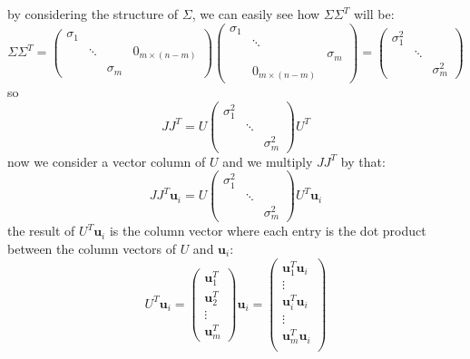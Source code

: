 \documentclass[10pt, a4paper]{report}
\begin{document}
by considering the structure of $\Sigma$, we can easily see how $\Sigma\Sigma^T$ will be:\begin{equation}
    \Sigma\Sigma^T=\begin{pmatrix}
        \sigma_1 & & & \\ 
        & \ddots & & 0_{m\times (n-m)}\\ 
        & & \sigma_m & 
    \end{pmatrix}
    \begin{pmatrix}
        \sigma_1 & &  \\ 
        & \ddots & \\ 
        & & \sigma_m \\
        &0_{m\times (n-m)}&
    \end{pmatrix}=\begin{pmatrix}
        \sigma_1^2 & &  \\ 
        & \ddots &   \\ 
        & & \sigma_m^2 
    \end{pmatrix}
\end{equation}
so\begin{equation}
JJ^T=U\begin{pmatrix}
        \sigma_1^2 & &  \\ 
        & \ddots &   \\ 
        & & \sigma_m^2 
    \end{pmatrix} U^T
\end{equation}
now we consider a vector column of $U$ and we multiply $JJ^T$ by that:\begin{equation}
    JJ^T\mathbf u_i=U\begin{pmatrix}
        \sigma_1^2 & &  \\ 
        & \ddots &   \\ 
        & & \sigma_m^2 
    \end{pmatrix} U^T\mathbf u_i
\end{equation}
the result of $U^T\mathbf u_i$ is the column vector where each entry is the dot product between the column vectors of $U$ and $\mathbf u_i$:\begin{equation}
    U^T\mathbf u_i=
        \begin{pmatrix}
            \mathbf u_1^T\\ 
            \mathbf u_2^T\\ 
            \vdots \\ 
            \mathbf u_m^T
        \end{pmatrix}\mathbf u_i=\begin{pmatrix}
            \mathbf u_1^T\mathbf u_i\\ 
            \vdots \\ 
             \mathbf u_i^T\mathbf u_i\\ 
             \vdots \\ 
            \mathbf u_m^T\mathbf u_i\\ 
        \end{pmatrix}
\end{equation}
\end{document}
